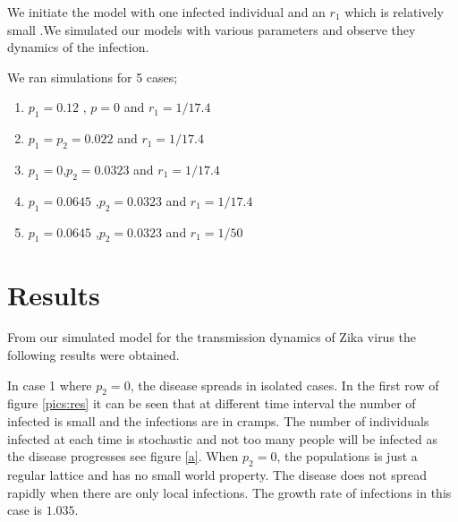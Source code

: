 We initiate the model with one infected individual and an $r_1$ which is relatively small .We simulated our models with various parameters and observe they dynamics  of the infection. 

We ran simulations for 5 cases;
\begin{enumerate}
\item $p_1 = 0.12$ , $p =0$ and $r_1 = 1/17.4$
\item $p_1 = p_2 = 0.022$ and $r_1 = 1/17.4$ 
\item $p_1 =0 $,$p_2 = 0.0323$ and $r_1 = 1/17.4$
\item $p_1 = 0.0645$ ,$p_2 = 0.0323$ and $r_1 = 1/17.4$
\item $p_1 = 0.0645$ ,$p_2 = 0.0323$ and $r_1 = 1/50$
\end{enumerate}



\section{Results}
From our simulated model for the transmission dynamics of Zika virus the following results were obtained.




In case 1 where $p_2 =0$, the disease spreads in isolated cases. In the first row of figure  \ref{pics:res} it can be seen that at different time interval the number of infected is small and  the infections are in cramps.
The number of individuals infected at each time is stochastic and not too many people will be infected as the disease progresses see figure \ref{a}.  When $p_2 = 0$, the populations is just a regular lattice and has no small world property. The disease does not spread rapidly when there are only local infections. The growth rate of infections in this case is $1.035$.

